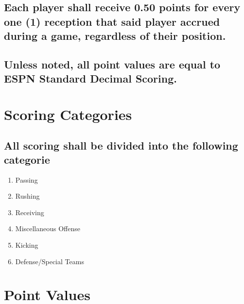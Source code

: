 \documentclass[
]{book}
\providecommand{\tightlist}{%
  \setlength{\itemsep}{0pt}\setlength{\parskip}{0pt}}
\begin{document}
\hypertarget{each-player-shall-receive-0.50-points-for-every-one-1-reception-that-said-player-accrued-during-a-game-regardless-of-their-position.}{%
\subsection{Each player shall receive 0.50 points for every one (1) reception that said player accrued during a game, regardless of their position.}\label{each-player-shall-receive-0.50-points-for-every-one-1-reception-that-said-player-accrued-during-a-game-regardless-of-their-position.}}

\hypertarget{unless-noted-all-point-values-are-equal-to-espn-standard-decimal-scoring.}{%
\subsection{Unless noted, all point values are equal to ESPN Standard Decimal Scoring.}\label{unless-noted-all-point-values-are-equal-to-espn-standard-decimal-scoring.}}

\hypertarget{scoring-categories}{%
\section{Scoring Categories}\label{scoring-categories}}

\hypertarget{all-scoring-shall-be-divided-into-the-following-categorie}{%
\subsection{All scoring shall be divided into the following categorie}\label{all-scoring-shall-be-divided-into-the-following-categorie}}

\begin{enumerate}
\def\labelenumi{\arabic{enumi}.}
\tightlist
\item
  Passing
\item
  Rushing
\item
  Receiving
\item
  Miscellaneous Offense
\item
  Kicking
\item
  Defense/Special Teams
\end{enumerate}

\hypertarget{point-values}{%
\section{Point Values}\label{point-values}}
\end{document}
